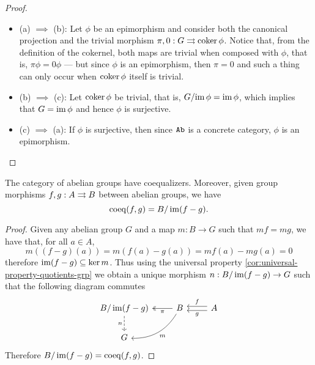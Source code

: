 \begin{proof}
    \begin{itemize}\setlength\itemsep{0em}
        \item (a) \(\implies\) (b): Let \(\phi\) be an epimorphism and consider both the
              canonical projection and the trivial morphism
              \(\pi, 0: G \rightrightarrows \operatorname{coker} \phi\). Notice that, from the definition
              of the cokernel, both maps are trivial when composed with \(\phi\), that is,
              \(\pi \phi = 0 \phi\) --- but since \(\phi\) is an epimorphism, then
              \(\pi = 0\) and such a thing can only occur when \(\operatorname{coker} \phi\) itself is
              trivial.

        \item (b) \(\implies\) (c): Let \(\operatorname{coker} \phi\) be trivial, that is,
              \(G/{\operatorname{im} \phi} = \operatorname{im} \phi\), which implies that \(G = \operatorname{im} \phi\) and hence
              \(\phi\) is surjective.

        \item (c) \(\implies\) (a): If \(\phi\) is surjective, then since \(\Ab\) is a
              concrete category, \(\phi\) is an epimorphism.
    \end{itemize}
\end{proof}

\begin{proposition}[Coequalizers in \(\Ab\)]
    \label{prop:coequalizer-Ab}
    The category of abelian groups have coequalizers. Moreover, given group
    morphisms \(f, g: A \rightrightarrows B\) between abelian groups, we have
    \[
        \operatorname{coeq}(f, g) = B/\operatorname{im}(f - g).
    \]
\end{proposition}

\begin{proof}
    Given any abelian group \(G\) and a map \(m: B \to G\) such that \(m f = m g\),
    we have that, for all \(a \in A\),
    \[
        m((f - g)(a)) = m(f(a) - g(a)) = m f(a) - m g(a) = 0
    \]
    therefore \(\operatorname{im}(f - g) \subseteq \ker m\). Thus using the universal property
    \cref{cor:universal-property-quotients-grp} we obtain a unique morphism \(n:
    B/\operatorname{im}(f - g) \to G\) such that the following diagram commutes
    \[
        \begin{tikzcd}
            B/\im(f - g) \ar[d, dashed, "n"']
            &B \ar[l, two heads, "\pi"] \ar[ld, bend left, "m"]
            &A \ar[l, shift right, "f"'] \ar[l, shift left, "g"] \\
            G & &
        \end{tikzcd}
    \]
    Therefore \(B/\operatorname{im}(f - g) = \operatorname{coeq}(f, g)\).
\end{proof}

